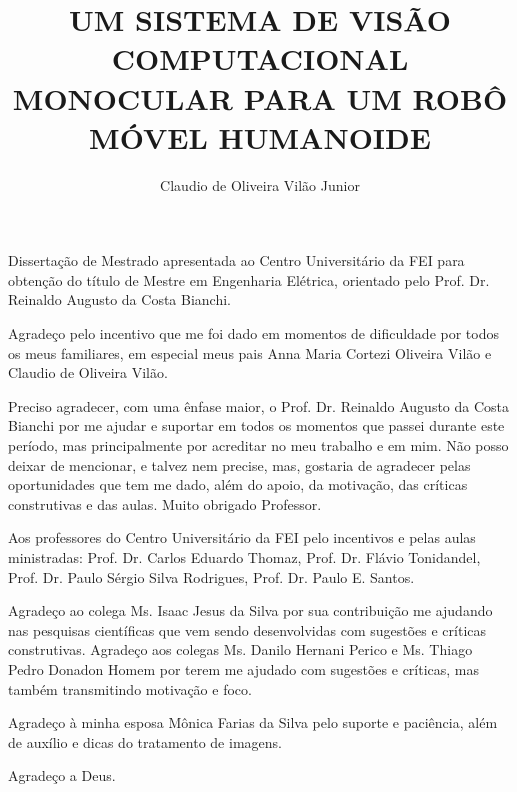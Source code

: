 \documentclass[rascunho]{fei}
\author{Claudio de Oliveira Vilão Junior}
\title{UM SISTEMA DE VISÃO COMPUTACIONAL MONOCULAR PARA UM ROBÔ MÓVEL HUMANOIDE}
\begin{document}
\overfullrule=2cm
\maketitle

\begin{folhaderosto}
Dissertação de Mestrado apresentada ao Centro Universitário da FEI para obtenção do título de Mestre em Engenharia Elétrica, orientado pelo Prof. Dr. Reinaldo Augusto da Costa Bianchi.
\end{folhaderosto}

\fichacatalografica
\folhadeaprovacao
{}

\begin{agradecimentos}
Agradeço pelo incentivo que me foi dado em momentos de dificuldade por todos os meus familiares, em especial meus pais Anna Maria Cortezi Oliveira Vilão e Claudio de Oliveira Vilão. 

Preciso agradecer, com uma ênfase maior, o Prof. Dr. Reinaldo Augusto da Costa Bianchi por me ajudar e suportar em todos os momentos que passei durante este período, mas principalmente por acreditar no meu trabalho e em mim. Não posso deixar de mencionar, e talvez nem precise,  mas, gostaria de agradecer pelas oportunidades que tem me dado, além do apoio, da motivação, das críticas construtivas e das aulas. Muito obrigado Professor.

Aos professores do Centro Universitário da FEI pelo incentivos e pelas aulas ministradas: Prof. Dr. Carlos Eduardo Thomaz, Prof. Dr. Flávio Tonidandel, Prof. Dr. Paulo Sérgio Silva Rodrigues, Prof. Dr. Paulo E. Santos.

Agradeço ao colega Ms. Isaac Jesus da Silva por sua contribuição me ajudando nas pesquisas científicas que vem sendo desenvolvidas com sugestões e críticas construtivas.
Agradeço aos colegas Ms. Danilo Hernani Perico e Ms. Thiago Pedro Donadon Homem por terem me ajudado com sugestões e críticas, mas também transmitindo motivação e foco.

Agradeço à minha esposa Mônica Farias da Silva pelo suporte e paciência, além de auxílio e dicas do tratamento de imagens.

Agradeço a Deus.
\end{agradecimentos}

\end{document}
